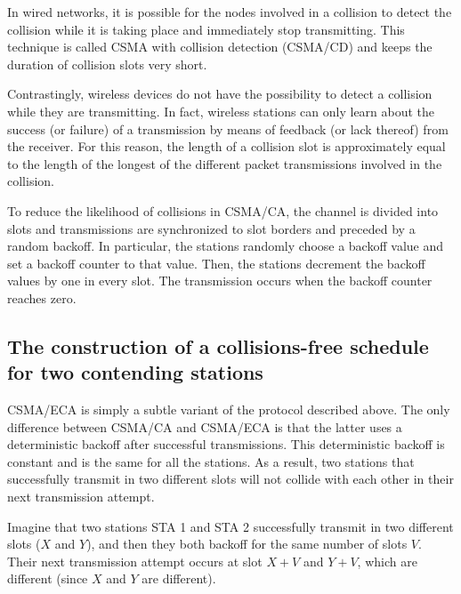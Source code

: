 \documentclass[journal]{IEEEtran}
\begin{document}
In wired networks, it is possible for the nodes involved in a collision to detect the collision while it is taking place and immediately stop transmitting.
This technique is called CSMA with collision detection (CSMA/CD) and keeps the duration of collision slots very short.

Contrastingly, wireless devices do not have the possibility to detect a collision while they are transmitting.
In fact, wireless stations can only learn about the success (or failure) of a transmission by means of feedback (or lack thereof) from the receiver.
For this reason, the length of a collision slot is approximately equal to the length of the longest of the different packet transmissions involved in the collision.

To reduce the likelihood of collisions in CSMA/CA, the channel is divided into slots and transmissions are synchronized to slot borders and preceded by a random backoff.
In particular, the stations randomly choose a backoff value and set a backoff counter to that value.
Then, the stations decrement the backoff values by one in every slot.
The transmission occurs when the backoff counter reaches zero.

\subsection{The construction of a collisions-free schedule for two contending stations}
CSMA/ECA is simply a subtle variant of the protocol described above.
The only difference between CSMA/CA and CSMA/ECA is that the latter uses a deterministic backoff after successful transmissions.
This deterministic backoff is constant and is the same for all the stations.
As a result, two stations that successfully transmit in two different slots will not collide with each other in their next transmission attempt.

Imagine that two stations STA 1 and STA 2 successfully transmit in two different slots ($X$ and $Y$),  and then they both backoff for the same number of slots $V$.
Their next transmission attempt occurs at slot $X+V$ and $Y+V$, which are different (since $X$ and $Y$ are different).
\end{document}
